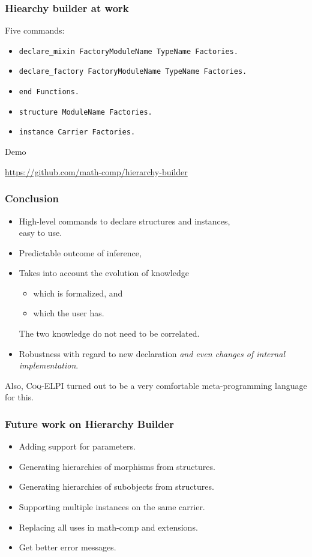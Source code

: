 \documentclass[11pt]{beamer}
\let\L=\lstinline
\begin{document}
\begin{frame}[fragile]
  \frametitle{Hiearchy builder at work}
  
  Five commands:
  \begin{itemize}
  \item \L{declare_mixin FactoryModuleName TypeName Factories.}
  \item \L{declare_factory FactoryModuleName TypeName Factories.}
  \item \L{end Functions.}
  \item \L{structure ModuleName Factories.}
  \item \L{instance Carrier Factories.}
  \end{itemize}
  \vfill
  \begin{center}
    Demo

    \url{https://github.com/math-comp/hierarchy-builder}
  \end{center}
  
\end{frame}

\begin{frame}
  \frametitle{Conclusion}
  
  \begin{itemize}
  \item High-level commands to declare structures and instances, \\
    easy to use.
    \vfill
  \item Predictable outcome of inference,
    \vfill
  \item Takes into account the evolution of knowledge
    \begin{itemize}
    \item which is formalized, and
    \item which the user has.
    \end{itemize}
    The two knowledge do not need to be correlated.
    \vfill
  \item Robustness with regard to new declaration \emph{and even changes of
    internal implementation}.
  \end{itemize}
  
  \vfill\pause
  Also, \textsc{Coq-ELPI} turned out to be a very comfortable
  meta-programming language for this.

\end{frame}

\begin{frame}
  \frametitle{Future work on Hierarchy Builder}
  \begin{itemize}
  \item Adding support for parameters.
    \vfill
  \item Generating hierarchies of morphisms from structures.
    \vfill
  \item Generating hierarchies of subobjects from structures.
    \vfill
  \item Supporting multiple instances on the same carrier.
    \vfill
  \item Replacing all uses in math-comp and extensions.
    \vfill
  \item Get better error messages.
  \end{itemize}
\end{frame}
\end{document}
